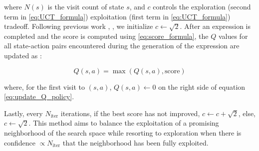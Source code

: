 \documentclass[runningheads]{llncs}
\begin{document}
where $N(s)$ is the visit count of state $s$, and $c$ controls the exploration (second term in \ref{eq:UCT_formula}) exploitation (first term in \ref{eq:UCT_formula}) tradeoff. Following previous work \cite{Swiechowski2023} \cite{Auer2002}, \cite{kuleshov2014algorithms} \cite{10.1007/11871842_29}, we initialize $c \gets \sqrt{2}$. After an expression is completed and the score is computed using \ref{eq:score_formula}, the $Q$ values for all state-action pairs encountered during the generation of the expression are updated as \cite{sun2023symbolic}:

\begin{equation}
Q(s,a) = \max{\left(Q(s,a), \mathrm{score}\right)} \label{eq:update_Q_policy}
\end{equation}

where, for the first visit to $(s,a)$, $Q(s,a) \gets 0$ on the right side of equation \ref{eq:update_Q_policy}. 
\par Lastly, every $N_{\mathrm{iter}}$ iterations, if the best score has not improved, $c \gets c + \sqrt{2}$, else, $c \gets \sqrt{2}$. This method aims to balance the exploitation of a promising neighborhood of the search space while resorting to exploration when there is confidence $\propto N_{\mathrm{iter}}$ that the neighborhood has been fully exploited.
\end{document}
